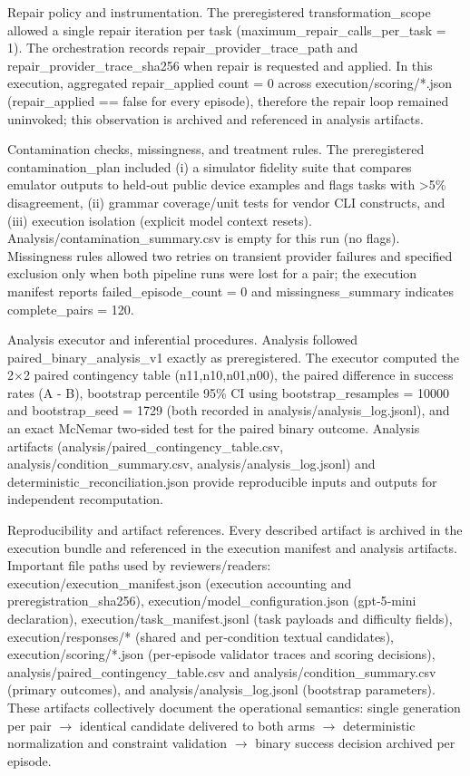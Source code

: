 \documentclass[conference]{IEEEtran}
\begin{document}
Repair policy and instrumentation. The preregistered transformation\_scope allowed a single repair iteration per task (maximum\_repair\_calls\_per\_task = 1). The orchestration records repair\_provider\_trace\_path and repair\_provider\_trace\_sha256 when repair is requested and applied. In this execution, aggregated repair\_applied count = 0 across execution/scoring/*.json (repair\_applied == false for every episode), therefore the repair loop remained uninvoked; this observation is archived and referenced in analysis artifacts.

Contamination checks, missingness, and treatment rules. The preregistered contamination\_plan included (i) a simulator fidelity suite that compares emulator outputs to held‑out public device examples and flags tasks with >5\% disagreement, (ii) grammar coverage/unit tests for vendor CLI constructs, and (iii) execution isolation (explicit model context resets). Analysis/contamination\_summary.csv is empty for this run (no flags). Missingness rules allowed two retries on transient provider failures and specified exclusion only when both pipeline runs were lost for a pair; the execution manifest reports failed\_episode\_count = 0 and missingness\_summary indicates complete\_pairs = 120.

Analysis executor and inferential procedures. Analysis followed paired\_binary\_analysis\_v1 exactly as preregistered. The executor computed the 2\ensuremath{\times}2 paired contingency table (n11,n10,n01,n00), the paired difference in success rates (A - B), bootstrap percentile 95\% CI using bootstrap\_resamples = 10000 and bootstrap\_seed = 1729 (both recorded in analysis/analysis\_log.jsonl), and an exact McNemar two‑sided test for the paired binary outcome. Analysis artifacts (analysis/paired\_contingency\_table.csv, analysis/condition\_summary.csv, analysis/analysis\_log.jsonl) and deterministic\_reconciliation.json provide reproducible inputs and outputs for independent recomputation.

Reproducibility and artifact references. Every described artifact is archived in the execution bundle and referenced in the execution manifest and analysis artifacts. Important file paths used by reviewers/readers: execution/execution\_manifest.json (execution accounting and preregistration\_sha256), execution/model\_configuration.json (gpt‑5‑mini declaration), execution/task\_manifest.jsonl (task payloads and difficulty fields), execution/responses/* (shared and per‑condition textual candidates), execution/scoring/*.json (per‑episode validator traces and scoring decisions), analysis/paired\_contingency\_table.csv and analysis/condition\_summary.csv (primary outcomes), and analysis/analysis\_log.jsonl (bootstrap parameters). These artifacts collectively document the operational semantics: single generation per pair \ensuremath{\rightarrow} identical candidate delivered to both arms \ensuremath{\rightarrow} deterministic normalization and constraint validation \ensuremath{\rightarrow} binary success decision archived per episode.
\end{document}
